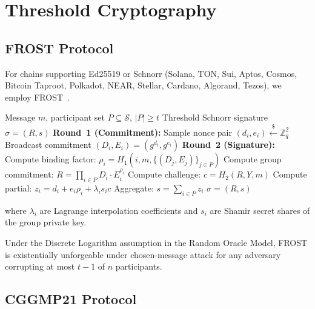 \section{Threshold Cryptography}

\label{sec:threshold}

\subsection{FROST Protocol}

For chains supporting Ed25519 or Schnorr (Solana, TON, Sui, Aptos, Cosmos, Bitcoin Taproot, Polkadot, NEAR, Stellar, Cardano, Algorand, Tezos), we employ FROST~\cite{frost}.

\begin{algorithm}
\caption{FROST $t$-of-$n$ Threshold Signing}
\begin{algorithmic}[1]
\Require Message $m$, participant set $P \subseteq \mathcal{S}$, $|P| \geq t$
\Ensure Threshold Schnorr signature $\sigma = (R, s)$
\State \textbf{Round~1 (Commitment):}
  \State Sample nonce pair $(d_i, e_i) \xleftarrow{\$} \mathbb{Z}_q^2$
  \State Broadcast commitment $(D_i, E_i) = (g^{d_i}, g^{e_i})$
\EndFor
\State \textbf{Round~2 (Signature):}
\State Compute binding factor: $\rho_i = H_1(i, m, \{(D_j, E_j)\}_{j \in P})$
\State Compute group commitment: $R = \prod_{i \in P} D_i \cdot E_i^{\rho_i}$
\State Compute challenge: $c = H_2(R, Y, m)$
  \State Compute partial: $z_i = d_i + e_i \rho_i + \lambda_i s_i c$
\EndFor
\State Aggregate: $s = \sum_{i \in P} z_i$
\State \Return $\sigma = (R, s)$
\end{algorithmic}
\end{algorithm}

where $\lambda_i$ are Lagrange interpolation coefficients and $s_i$ are Shamir secret shares of the group private key.

\begin{theorem}
Under the Discrete Logarithm assumption in the Random Oracle Model, FROST is existentially unforgeable under chosen-message attack for any adversary corrupting at most $t - 1$ of $n$ participants.
\end{theorem}

\subsection{CGGMP21 Protocol}

